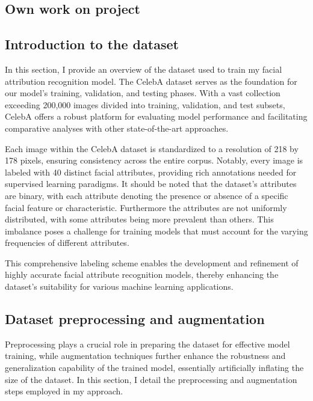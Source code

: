 \documentclass[a4paper,oneside]{article}
\begin{document}
\newpage
\begin{center}
  \section{Own work on project}
  \label{sec:work}
\end{center}

\subsection{Introduction to the dataset}
\label{sec:subsection_dataset_intro}

In this section, I provide an overview of the dataset used to train my facial attribution recognition model.
The CelebA dataset serves as the foundation for our model's training, validation, and testing phases.
With a vast collection exceeding 200,000 images divided into training, validation, and test subsets, CelebA offers a robust platform for evaluating model performance and facilitating comparative analyses with other state-of-the-art approaches.

Each image within the CelebA dataset is standardized to a resolution of 218 by 178 pixels, ensuring consistency across the entire corpus.
Notably, every image is labeled with 40 distinct facial attributes, providing rich annotations needed for supervised learning paradigms.
It should be noted that the dataset's attributes are binary, with each attribute denoting the presence or absence of a specific facial feature or characteristic.
Furthermore the attributes are not uniformly distributed, with some attributes being more prevalent than others.
This imbalance poses a challenge for training models that must account for the varying frequencies of different attributes.

This comprehensive labeling scheme enables the development and refinement of highly accurate facial attribute recognition models, thereby enhancing the dataset's suitability for various machine learning applications.

\subsection{Dataset preprocessing and augmentation}
\label{sec:subsection_dataset_preprocessing}


Preprocessing plays a crucial role in preparing the dataset for effective model training, while augmentation techniques further enhance the robustness and generalization capability of the trained model, essentially artificially inflating the size of the dataset. In this section, I detail the preprocessing and augmentation steps employed in my approach.
\end{document}
